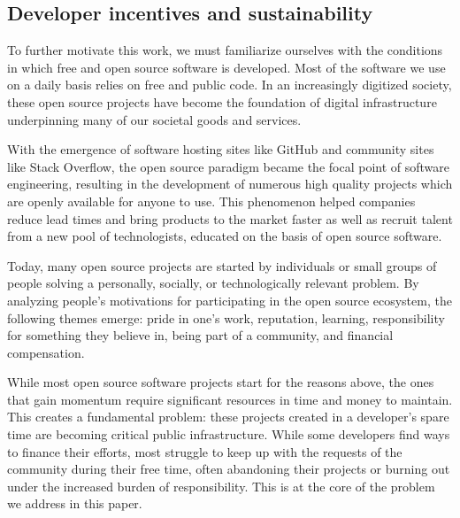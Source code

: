 \subsection{Developer incentives and sustainability}
\label{s:incentives}

To further motivate this work, we must familiarize ourselves with the
conditions in which free and open source software is developed. Most of the
software we use on a daily basis relies on free and public code. In an
increasingly digitized society, these open source projects have become the
foundation of digital infrastructure underpinning many of our societal goods
and services.

With the emergence of software hosting sites like GitHub and community sites
like Stack Overflow, the open source paradigm became the focal point of
software engineering, resulting in the development of numerous high quality
projects which are openly available for anyone to use. This phenomenon helped
companies reduce lead times and bring products to the market faster as well as
recruit talent from a new pool of technologists, educated on the basis of
open source software.

Today, many open source projects are started by individuals or small groups of
people solving a personally, socially, or technologically relevant problem. By
analyzing people's motivations for participating in the open source ecosystem,
the following themes emerge: pride in one's work, reputation, learning,
responsibility for something they believe in, being part of a community, and
financial compensation.

While most open source software projects start for the reasons above, the ones
that gain momentum require significant resources in time and money to maintain.
This creates a fundamental problem: these projects created in a developer's
spare time are becoming critical public infrastructure. While some developers
find ways to finance their efforts, most struggle to keep up with the requests
of the community during their free time, often abandoning their projects or
burning out under the increased burden of responsibility.  This is at the core
of the problem we address in this paper.
